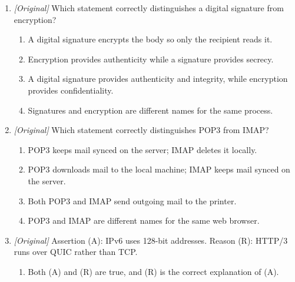 \documentclass[11pt]{article}
\begin{document}
\begin{enumerate}[label=\textbf{Q\arabic*.}, leftmargin=*]
\begin{enumerate}[label=\Roman*.]
    \item Registers are the fastest storage in a computer.
    \item Cache memory is faster than main memory.
    \item RAM is non-volatile and retains data when the power is off.
  \end{enumerate}
  \begin{enumerate}[label=\Alph*.]
    \item I only
    \item I and II only
    \item II and III only
    \item I, II, and III
  \end{enumerate}
\item \textit{[Original]} Which statement correctly distinguishes a digital
  signature from encryption?
  \begin{enumerate}[label=\Alph*.]
    \item A digital signature encrypts the body so only the recipient reads it.
    \item Encryption provides authenticity while a signature provides secrecy.
    \item A digital signature provides authenticity and integrity, while
      encryption provides confidentiality.
    \item Signatures and encryption are different names for the same process.
  \end{enumerate}
\item \textit{[Original]} Which statement correctly distinguishes POP3 from
  IMAP?
  \begin{enumerate}[label=\Alph*.]
    \item POP3 keeps mail synced on the server; IMAP deletes it locally.
    \item POP3 downloads mail to the local machine; IMAP keeps mail synced
      on the server.
    \item Both POP3 and IMAP send outgoing mail to the printer.
    \item POP3 and IMAP are different names for the same web browser.
  \end{enumerate}
\item \textit{[Original]} Assertion (A): IPv6 uses 128-bit addresses.
  Reason (R): HTTP/3 runs over QUIC rather than TCP.
  \begin{enumerate}[label=\Alph*.]
    \item Both (A) and (R) are true, and (R) is the correct explanation of (A).

\end{enumerate}
\end{enumerate}
\end{document}
